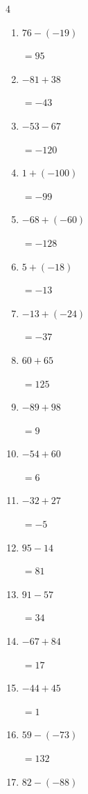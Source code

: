 \begin{multicols}{4}
\begin{enumerate}
        $=63$

  \item $76-(-19)$

        $=95$

  \item $-81+38$

        $=-43$

  \item $-53-67$

        $=-120$

  \item $1+(-100)$

        $=-99$

  \item $-68+(-60)$

        $=-128$

  \item $5+(-18)$

        $=-13$

  \item $-13+(-24)$

        $=-37$

  \item $60+65$

        $=125$

  \item $-89+98$

        $=9$

  \item $-54+60$

        $=6$

  \item $-32+27$

        $=-5$

  \item $95-14$

        $=81$

  \item $91-57$

        $=34$

  \item $-67+84$

        $=17$

  \item $-44+45$

        $=1$

\columnbreak %

  \item $59-(-73)$

        $=132$

  \item $82-(-88)$


\end{enumerate}
\end{multicols}
